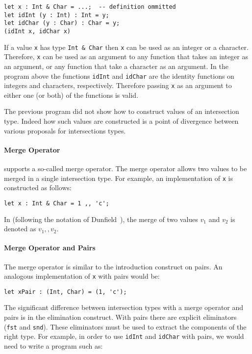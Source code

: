 \begin{lstlisting}
let x : Int & Char = ...;  -- definition ommitted
let idInt (y : Int) : Int = y;
let idChar (y : Char) : Char = y;
(idInt x, idChar x)
\end{lstlisting} 

\noindent If a value \lstinline{x} has type \lstinline{Int & Char} then
\lstinline{x} can be used as an integer or a character. Therefore, 
\lstinline{x} can be used as an argument to any function that takes 
an integer as an argument, or any 
function that take a character as an argument. In the program above 
the functions \lstinline{idInt} and \lstinline{idChar} are the
identity functions on integers and characters, respectively. Therefore 
passing \lstinline{x} as an argument to either one (or both) of the
functions is valid. 

The previous program did not show how to construct values of an 
intersection type. Indeed how such values are constructed is a point 
of divergence between various proposals for intersections types.

\paragraph{Merge Operator}
\name supports a so-called merge operator. The merge operator allows 
two values to be merged in a single intersection type. For example, an 
implementation of \lstinline{x} is constructed as follows:

\begin{lstlisting}
let x : Int & Char = 1 ,, 'c';
\end{lstlisting}

\noindent In \name (following the notation of Dunfield~\cite{}), the
merge of two values $v_1$ and $v_2$ is denoted as $v_1 ,, v_2$.

\paragraph{Merge Operator and Pairs}
The merge operator is similar to the introduction construct on pairs. 
An analogous implementation of \lstinline{x} with pairs would be:

\begin{lstlisting}
let xPair : (Int, Char) = (1, 'c');
\end{lstlisting} 

\noindent The significant difference between intersection types with a
merge operator and pairs is in the elimination construct. With pairs
there are explicit eliminators (\lstinline{fst} and
\lstinline{snd}). These eliminators must be used to extract the
components of the right type. For example, in order to use
\lstinline{idInt} and \lstinline{idChar} with pairs, we would need to 
write a program such as: 

